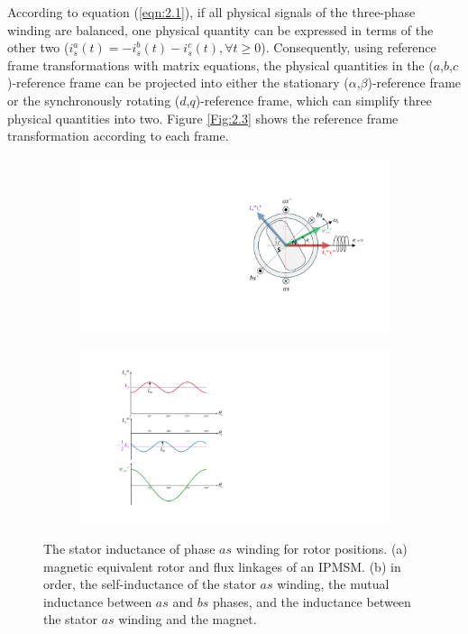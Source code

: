 According to equation (\ref{eqn:2.1}), if all physical signals of the three-phase winding are balanced, one physical quantity can be expressed in terms of the other two ($i^a_s(t)=-i^b_s(t)-i^c_s(t), \forall t \geq 0$). Consequently, using reference frame transformations with matrix equations, the physical quantities in the ($a$,$b$,$c$)-reference frame can be projected into either the stationary ($\alpha$,$\beta$)-reference frame or the synchronously rotating ($d$,$q$)-reference frame, which can simplify three physical quantities into two. Figure \ref{Fig:2.3} shows the reference frame transformation according to each frame.
\begin{figure}[t]
    \centering
    \begin{subfigure}[b]{0.45\textwidth}
        \centering
        \includegraphics[scale=0.6]{chapters/Fig2.2a.pdf}
        \caption{}
        \label{Fig:2.2a}
    \end{subfigure}
    \hfill
    \begin{subfigure}[b]{0.45\textwidth}
        \centering
        \includegraphics[scale=0.6]{chapters/Fig2.2b.pdf}
        \caption{}
        \label{Fig:2.2b}
    \end{subfigure}
    \caption{The stator inductance of phase $as$ winding for rotor positions. (a) magnetic equivalent rotor and flux linkages of an IPMSM. (b) in order, the self-inductance of the stator $as$ winding, the mutual inductance between $as$ and $bs$ phases, and the inductance between the stator $as$ winding and the magnet.}
    \label{Fig:2.2}
\end{figure}
